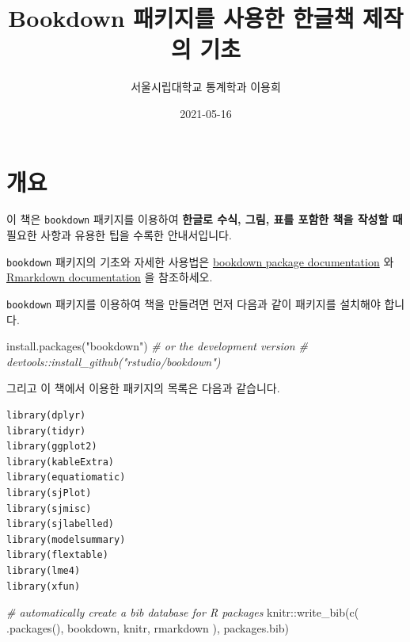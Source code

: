 \documentclass[
]{book}
\title{Bookdown 패키지를 사용한 한글책 제작의 기초}
\author{서울시립대학교 통계학과 이용희}
\date{2021-05-16}
\newenvironment{Shaded}{\begin{snugshade}}{\end{snugshade}}
\newcommand{\CommentTok}[1]{\textcolor[rgb]{0.56,0.35,0.01}{\textit{#1}}}
\newcommand{\FunctionTok}[1]{\textcolor[rgb]{0.00,0.00,0.00}{#1}}
\newcommand{\NormalTok}[1]{#1}
\newcommand{\SpecialCharTok}[1]{\textcolor[rgb]{0.00,0.00,0.00}{#1}}
\newcommand{\StringTok}[1]{\textcolor[rgb]{0.31,0.60,0.02}{#1}}
\theoremstyle{definition}
\theoremstyle{definition}
\theoremstyle{definition}
\theoremstyle{definition}
\theoremstyle{remark}
\begin{document}
\maketitle

{
\setcounter{tocdepth}{1}
\tableofcontents
}
\hypertarget{uxac1cuxc694}{%
\chapter*{개요}\label{uxac1cuxc694}}


이 책은 \texttt{bookdown} 패키지를 이용하여 \textbf{한글로 수식, 그림, 표를 포함한 책을 작성할 때} 필요한 사항과 유용한 팁을 수록한 안내서입니다.

\texttt{bookdown} 패키지의 기초와 자세한 사용법은 \href{https://bookdown.org/yihui/bookdown/}{bookdown package documentation} 와 \href{https://rmarkdown.rstudio.com/}{Rmarkdown documentation} 을 참조하세오.

\texttt{bookdown} 패키지를 이용하여 책을 만들려면 먼저 다음과 같이 패키지를 설치해야 합니다.

\begin{Shaded}
\begin{Highlighting}[]
\FunctionTok{install.packages}\NormalTok{(}\StringTok{"bookdown"}\NormalTok{)}
\CommentTok{\# or the development version}
\CommentTok{\# devtools::install\_github("rstudio/bookdown")}
\end{Highlighting}
\end{Shaded}

그리고 이 책에서 이용한 패키지의 목록은 다음과 같습니다.

\begin{verbatim}
library(dplyr)
library(tidyr)
library(ggplot2)
library(kableExtra)
library(equatiomatic)
library(sjPlot)
library(sjmisc)
library(sjlabelled)
library(modelsummary)
library(flextable)
library(lme4)
library(xfun)
\end{verbatim}

\begin{Shaded}
\begin{Highlighting}[]
\CommentTok{\# automatically create a bib database for R packages}
\NormalTok{knitr}\SpecialCharTok{::}\FunctionTok{write\_bib}\NormalTok{(}\FunctionTok{c}\NormalTok{(}
  \FunctionTok{.packages}\NormalTok{(), }\StringTok{\textquotesingle{}bookdown\textquotesingle{}}\NormalTok{, }\StringTok{\textquotesingle{}knitr\textquotesingle{}}\NormalTok{, }\StringTok{\textquotesingle{}rmarkdown\textquotesingle{}}
\NormalTok{), }\StringTok{\textquotesingle{}packages.bib\textquotesingle{}}\NormalTok{)}
\end{Highlighting}
\end{Shaded}
\end{document}
